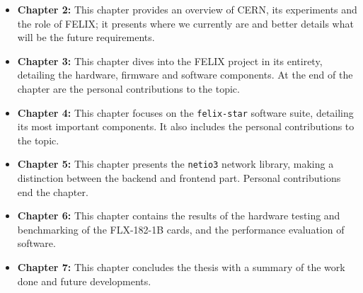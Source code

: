 \begin{itemize}
    \item \textbf{Chapter 2:} This chapter provides an overview of \acs{CERN}, its experiments and the role of \acs{FELIX}; it presents where we currently are and better details what will be the future requirements.
    
    \item \textbf{Chapter 3:} This chapter dives into the \acs{FELIX} project in its entirety, detailing the hardware, firmware and software components. At the end of the chapter are the personal contributions to the topic.
    
    \item \textbf{Chapter 4:} This chapter focuses on the \texttt{felix-star} software suite, detailing its most important components. It also includes the personal contributions to the topic.
    
    \item \textbf{Chapter 5:} This chapter presents the \texttt{netio3} network library, making a distinction between the backend and frontend part. Personal contributions end the chapter.
    
    \item \textbf{Chapter 6:} This chapter contains the results of the hardware testing and benchmarking of the FLX-182-1B cards, and the performance evaluation of software.
    
    \item \textbf{Chapter 7:} This chapter concludes the thesis with a summary of the work done and future developments.
\end{itemize}